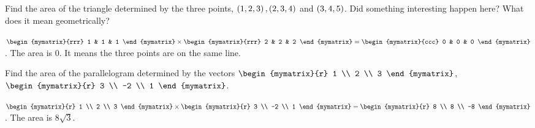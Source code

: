 \begin{enumialphparenastyle}
\begin{ex}
  Find the area of the triangle determined by the three points,
  $\left( 1,2,3\right) ,\left(2,3,4\right) $ and $\left(3,4,5\right)$. Did something
  interesting happen here? What does it mean geometrically?
  \begin{sol}
    $\begin{mymatrix}{rrr}
      1 & 1 & 1
    \end{mymatrix} \times \begin{mymatrix}{rrr}
      2 & 2 & 2
    \end{mymatrix} =\begin{mymatrix}{ccc}
      0 & 0 & 0
    \end{mymatrix}$.  The area is 0. It means the three points are on
    the same line.
  \end{sol}
\end{ex}

\begin{ex}
  Find the area of the parallelogram determined by the vectors
  $\begin{mymatrix}{r}
    1 \\
    2 \\
    3
  \end{mymatrix}$, $\begin{mymatrix}{r}
    3 \\
    -2 \\
    1
  \end{mymatrix}$.
  \begin{sol}
    $\begin{mymatrix}{r}
      1 \\
      2 \\
      3
    \end{mymatrix} \times
    \begin{mymatrix}{r}
      3 \\
      -2 \\
      1
    \end{mymatrix} =\begin{mymatrix}{r}
      8 \\
      8 \\
      -8
    \end{mymatrix}$. The area is $8\sqrt{3}$.
  \end{sol}
\end{ex}



\end{enumialphparenastyle}
